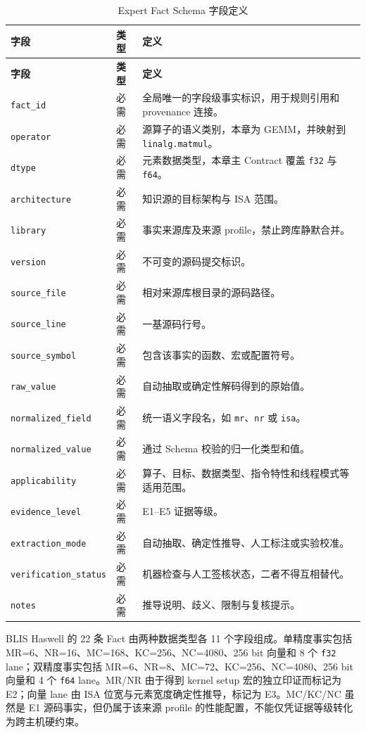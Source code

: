 \begingroup
\small
\begin{longtable}{@{}p{}p{}p{}@{}}
  \caption{Expert Fact Schema 字段定义}\label{tab:chapter3-fact-schema}\\
  \toprule
  \textbf{字段} & \textbf{类型} & \textbf{定义} \\
  \midrule
  \endfirsthead
  \toprule
  \textbf{字段} & \textbf{类型} & \textbf{定义} \\
  \midrule
  \endhead
  \texttt{fact\_id} & 必需 & 全局唯一的字段级事实标识，用于规则引用和 provenance 连接。 \\
  \texttt{operator} & 必需 & 源算子的语义类别，本章为 GEMM，并映射到 \texttt{linalg.matmul}。 \\
  \texttt{dtype} & 必需 & 元素数据类型，本章主 Contract 覆盖 \texttt{f32} 与 \texttt{f64}。 \\
  \texttt{architecture} & 必需 & 知识源的目标架构与 ISA 范围。 \\
  \texttt{library} & 必需 & 事实来源库及来源 profile，禁止跨库静默合并。 \\
  \texttt{version} & 必需 & 不可变的源码提交标识。 \\
  \texttt{source\_file} & 必需 & 相对来源库根目录的源码路径。 \\
  \texttt{source\_line} & 必需 & 一基源码行号。 \\
  \texttt{source\_symbol} & 必需 & 包含该事实的函数、宏或配置符号。 \\
  \texttt{raw\_value} & 必需 & 自动抽取或确定性解码得到的原始值。 \\
  \texttt{normalized\_field} & 必需 & 统一语义字段名，如 \texttt{mr}、\texttt{nr} 或 \texttt{isa}。 \\
  \texttt{normalized\_value} & 必需 & 通过 Schema 校验的归一化类型和值。 \\
  \texttt{applicability} & 必需 & 算子、目标、数据类型、指令特性和线程模式等适用范围。 \\
  \texttt{evidence\_level} & 必需 & E1--E5 证据等级。 \\
  \texttt{extraction\_mode} & 必需 & 自动抽取、确定性推导、人工标注或实验校准。 \\
  \texttt{verification\_status} & 必需 & 机器检查与人工签核状态，二者不得互相替代。 \\
  \texttt{notes} & 必需 & 推导说明、歧义、限制与复核提示。 \\
  \bottomrule
\end{longtable}
\endgroup

BLIS Haswell 的 22 条 Fact 由两种数据类型各 11 个字段组成。单精度事实包括 MR=6、NR=16、MC=168、KC=256、NC=4080、256 bit 向量和 8 个 \texttt{f32} lane；双精度事实包括 MR=6、NR=8、MC=72、KC=256、NC=4080、256 bit 向量和 4 个 \texttt{f64} lane。MR/NR 由于得到 kernel setup 宏的独立印证而标记为 E2；向量 lane 由 ISA 位宽与元素宽度确定性推导，标记为 E3。MC/KC/NC 虽然是 E1 源码事实，但仍属于该来源 profile 的性能配置，不能仅凭证据等级转化为跨主机硬约束。

